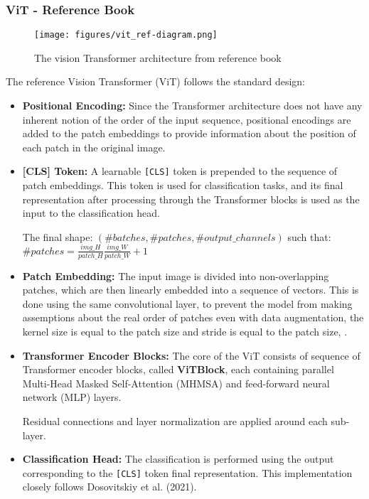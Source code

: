 \subsubsection{ViT - Reference Book}
\begin{figure}[h!]
    \centering
    \texttt{[image: figures/vit\_ref-diagram.png]}
    \caption{The vision Transformer architecture from reference book}
    \label{fig:enter-label}
\end{figure}
The reference Vision Transformer (ViT) follows the standard design:
\begin{itemize}
      \item \textbf{Positional Encoding:} Since the Transformer architecture does not have any inherent notion of the order of the input sequence, positional encodings are added to the patch embeddings to provide information about the position of each patch in the original image.
      \item \textbf{[CLS] Token:} A learnable \texttt{[CLS]} token is prepended to the sequence of patch embeddings. This token is used for classification tasks, and its final representation after processing through the Transformer blocks is used as the input to the classification head.
      
      The final shape: $(\#batches, \#patches, \#output\_channels)$
      such that:
      $\#patches =  \frac{img\_H}{patch\_H} \frac{img\_W}{patch\_W} + 1$
      \item \textbf{Patch Embedding:} The input image is divided into non-overlapping patches, which are then linearly embedded into a sequence of vectors. This is done using the same convolutional layer, to prevent the model from making assemptions about the real order of patches even with data augmentation, the kernel size is equal to the patch size and stride is equal to the patch size, .
      \item \textbf{Transformer Encoder Blocks:} The core of the ViT consists of sequence of Transformer encoder blocks, called  \textbf{ViTBlock}, each containing parallel Multi-Head Masked Self-Attention (MHMSA) and feed-forward neural network (MLP) layers.
      
      Residual connections and layer normalization are applied around each sub-layer.
      \item \textbf{Classification Head:} The classification is performed using the output corresponding to the \texttt{[CLS]} token final representation. This implementation closely follows Dosovitskiy et al. (2021).
\end{itemize}


